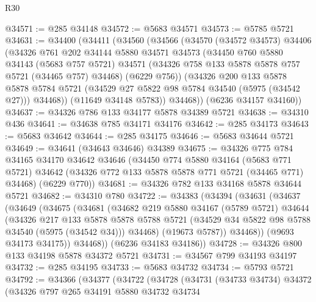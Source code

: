 \begin{lexlean}{R30}
\begin{coremodule}
@34571 := @285 @34148
@34572 := @5683 @34571
@34573 := @5785 @5721
@34631 := @34400
    (@34411
      (@34560
        (@34566
          (@34570
            (@34572 @34573)
            @34406
            (@34326
              @761
              @202
              @34144
              @5880
              @34571
              @34573
              (@34450
                @760
                @5880
                @34143
                (@5683 @757 @5721)
                @34571
                (@34326 @758 @133 @5878 @5878 @757 @5721 (@34465 @757) @34468)
                (@6229 @756))
              (@34326
                @200
                @133
                @5878
                @5878
                @5784
                @5721
                (@34529 @27 @5822 @98 @5784 @34540 (@5975 (@34542 @27)))
                @34468))
            (@11649 @34148 @5783))
          @34468))
      (@6236 @34157 @34160))
@34637 := @34326 @786 @133 @34177 @5878 @34389 @5721
@34638 := @34310 @436
@34641 := @34638 @785 @34171 @34176
@34642 := @285 @34173
@34643 := @5683 @34642
@34644 := @285 @34175
@34646 := @5683 @34644 @5721
@34649 := @34641 (@34643 @34646) @34389
@34675 := @34326
    @775
    @784
    @34165
    @34170
    @34642
    @34646
    (@34450
      @774
      @5880
      @34164
      (@5683 @771 @5721)
      @34642
      (@34326 @772 @133 @5878 @5878 @771 @5721 (@34465 @771) @34468)
      (@6229 @770))
@34681 := @34326 @782 @133 @34168 @5878 @34644 @5721
@34682 := @34310 @780
@34722 := @34383
    (@34394
      (@34631
        (@34637
          (@34649
            (@34675
              (@34681
                (@34682
                  @219
                  @5880
                  @34167
                  (@5789 @5721)
                  @34644
                  (@34326
                    @217
                    @133
                    @5878
                    @5878
                    @5788
                    @5721
                    (@34529 @34 @5822 @98 @5788 @34540 (@5975 (@34542 @34)))
                    @34468)
                  (@19673 @5787))
                @34468))
            (@9693 @34173 @34175))
          @34468))
      (@6236 @34183 @34186))
@34728 := @34326 @800 @133 @34198 @5878 @34372 @5721
@34731 := @34567 @799 @34193 @34197
@34732 := @285 @34195
@34733 := @5683 @34732
@34734 := @5793 @5721
@34792 := @34366
    (@34377
      (@34722
        (@34728
          (@34731
            (@34733 @34734)
            @34372
            (@34326
              @797
              @265
              @34191
              @5880
              @34732
              @34734

\end{coremodule}
\end{lexlean}
